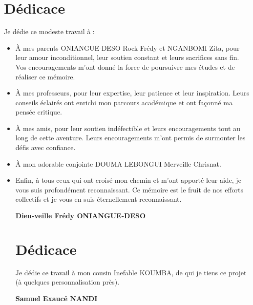 \chapter*{Dédicace}
Je dédie ce modeste travail à :

\begin{itemize}
  \item {
      À mes parents ONIANGUE-DESO Rock Frédy et NGANBOMI Zita, pour leur amour
      inconditionnel, leur soutien constant et leurs sacrifices sans fin. Vos
      encouragements m’ont donné la force de poursuivre mes études et de réaliser ce mémoire.
    }
  \item {
      À mes professeurs, pour leur expertise, leur patience et leur inspiration.
      Leurs conseils éclairés ont enrichi mon parcours académique et ont façonné ma pensée critique.

    }
  \item {
      À mes amis, pour leur soutien indéfectible et leurs encouragements tout au
      long de cette aventure. Leurs encouragements m’ont permis de surmonter les défis avec confiance.

    }

  \item {
      À mon adorable conjointe DOUMA LEBONGUI Merveille Chrisnat.

    }

  \item {
      Enfin, à tous ceux qui ont croisé mon chemin et m’ont apporté leur aide,
      je vous suis profondément reconnaissant. Ce mémoire est le fruit de nos
      efforts collectifs et je vous en suis éternellement reconnaissant.
    }

    \vspace{0.2cm}
    \begin{flushright}
      \large {
        \textbf {
          Dieu-veille Frédy ONIANGUE-DESO
        }
      }
    \end{flushright}


    \newpage
\chapter*{Dédicace}

    \vspace{2cm}
    Je dédie ce travail à mon cousin  Inefable KOUMBA, de qui je tiens ce projet (à quelques personnalisation près).
    \vspace{0.2cm}
    \begin{flushright}
      \large {
        \textbf {
          Samuel Exaucé NANDI
        }
      }
    \end{flushright}

\end{itemize}
